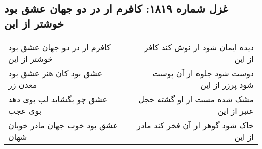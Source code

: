 \begin{center}
\section*{غزل شماره ۱۸۱۹: کافرم ار در دو جهان عشق بود خوشتر از این}
\label{sec:1819}
\begin{longtable}{l p{0.5cm} r}
کافرم ار در دو جهان عشق بود خوشتر از این
&&
دیده ایمان شود ار نوش کند کافر از این
\\
عشق بود کان هنر عشق بود معدن زر
&&
دوست شود جلوه از آن پوست شود پرزر از این
\\
عشق چو بگشاید لب بوی دهد بوی عجب
&&
مشک شده مست از او گشته خجل عنبر از این
\\
عشق بود خوب جهان مادر خوبان شهان
&&
خاک شود گوهر از آن فخر کند مادر از این
\\
\end{longtable}
\end{center}
